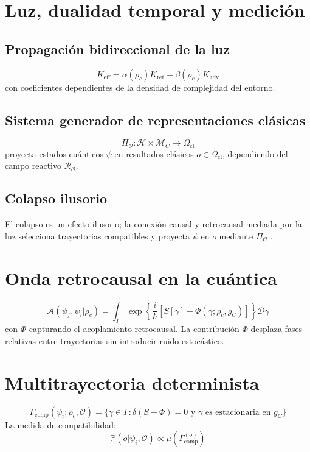 \documentclass[reprint,amsmath,amssymb,aps]{revtex4-2}
\begin{document}
\section{Luz, dualidad temporal y medición}
\subsection{Propagación bidireccional de la luz}
\begin{equation}
K_{\text{eff}} = \alpha(\rho_c) K_{\text{ret}} + \beta(\rho_c) K_{\text{adv}}
\end{equation}
con coeficientes dependientes de la densidad de complejidad del entorno.

\subsection{Sistema generador de representaciones clásicas}
\begin{equation}
\Pi_{\mathcal{O}}: \mathcal{H} \times \mathcal{M}_C \to \Omega_{\text{cl}}
\end{equation}
proyecta estados cuánticos $\psi$ en resultados clásicos $o \in \Omega_{\text{cl}}$, dependiendo del campo reactivo $\mathcal{R}_\mathcal{O}$.

\subsection{Colapso ilusorio}
El colapso es un efecto ilusorio; la conexión causal y retrocausal mediada por la luz selecciona trayectorias compatibles y proyecta $\psi$ en $o$ mediante $\Pi_{\mathcal{O}}$ \cite{Cramer1986, Aharonov1964}.

\section{Onda retrocausal en la cuántica}
\begin{equation}
\mathcal{A}(\psi_f, \psi_i|\rho_c) = \int_{\Gamma} \exp\left\{\frac{i}{\hbar}\left[S[\gamma] + \Phi(\gamma;\rho_c,g_C)\right]\right\} \mathcal{D}\gamma
\end{equation}
con $\Phi$ capturando el acoplamiento retrocausal. La contribución $\Phi$ desplaza fases relativas entre trayectorias sin introducir ruido estocástico.

\section{Multitrayectoria determinista}
\begin{equation}
\Gamma_{\text{comp}}(\psi_i;\rho_c, \mathcal{O}) = \{\gamma \in \Gamma : \delta (S+\Phi)=0 \text{ y }\gamma \text{ es estacionaria en } g_C \}
\end{equation}
La medida de compatibilidad:
\begin{equation}
\mathbb{P}(o|\psi_i,\mathcal{O}) \propto \mu(\Gamma_{\text{comp}}^{(o)})
\end{equation}
\end{document}

